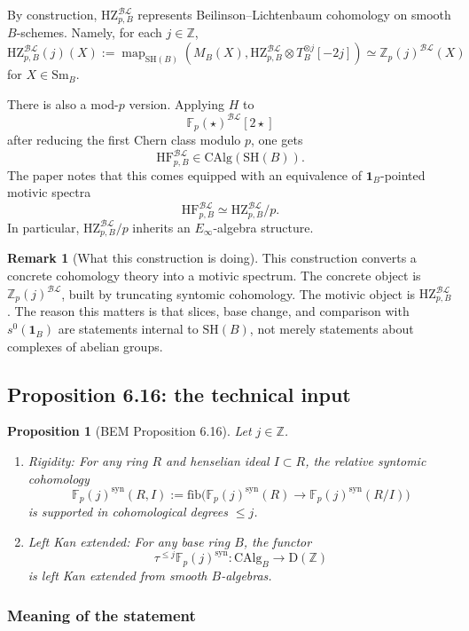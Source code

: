 \documentclass[11pt,a4paper]{article}
\newcommand{\Z}{\mathbb Z}
\newcommand{\F}{\mathbb F}
\newcommand{\SH}{\mathrm{SH}}
\newcommand{\Sm}{\mathrm{Sm}}
\newcommand{\CAlg}{\mathrm{CAlg}}
\newcommand{\D}{\mathrm{D}}
\newcommand{\BL}{\mathcal{BL}}
\newcommand{\syn}{\mathrm{syn}}
\newcommand{\HZ}{\mathrm{HZ}}
\newcommand{\HF}{\mathrm{HF}}
\newcommand{\fib}{\mathrm{fib}}
\newcommand{\1}{\mathbf 1}
\theoremstyle{bemstyle}
\newtheorem{proposition}[theorem]{Proposition}
\theoremstyle{definition}
\newtheorem{remark}[theorem]{Remark}
\begin{document}
By construction, \(\HZ^{\BL}_{p,B}\) represents Beilinson--Lichtenbaum cohomology on smooth \(B\)-schemes. Namely, for each \(j\in\Z\),
\[
  \HZ^{\BL}_{p,B}(j)(X)
  :=\operatorname{map}_{\SH(B)}(M_B(X),\HZ^{\BL}_{p,B}\otimes T_B^{\otimes j}[-2j])
  \simeq \Z_p(j)^{\BL}(X)
\]
for \(X\in\Sm_B\). 

There is also a mod-\(p\) version. Applying \(H\) to
\[
  \F_p(\star)^{\BL}[2\star]
\]
after reducing the first Chern class modulo \(p\), one gets
\[
  \HF^{\BL}_{p,B}\in\CAlg(\SH(B)).
\]
The paper notes that this comes equipped with an equivalence of \(\1_B\)-pointed motivic spectra
\[
  \HF^{\BL}_{p,B}\simeq \HZ^{\BL}_{p,B}/p.
\]
In particular, \(\HZ^{\BL}_{p,B}/p\) inherits an \(E_\infty\)-algebra structure.

\begin{remark}[What this construction is doing]
This construction converts a concrete cohomology theory into a motivic spectrum. The concrete object is \(\Z_p(j)^{\BL}\), built by truncating syntomic cohomology. The motivic object is \(\HZ^{\BL}_{p,B}\). The reason this matters is that slices, base change, and comparison with \(s^0(\1_B)\) are statements internal to \(\SH(B)\), not merely statements about complexes of abelian groups.
\end{remark}

\subsection{Proposition 6.16: the technical input}

\begin{proposition}[BEM Proposition 6.16]
Let \(j\in\Z\).
\begin{enumerate}
  \item Rigidity:  For any ring \(R\) and henselian ideal \(I\subset R\), the relative syntomic cohomology
  \[
    \F_p(j)^{\syn}(R,I):=\fib\bigl(\F_p(j)^{\syn}(R)\to \F_p(j)^{\syn}(R/I)\bigr)
  \]
  is supported in cohomological degrees \(\leq j\).
  \item Left Kan extended: For any base ring \(B\), the functor
  \[
    \tau^{\leq j}\F_p(j)^{\syn}:\CAlg_B\longrightarrow \D(\Z)
  \]
  is left Kan extended from smooth \(B\)-algebras.
\end{enumerate}
\end{proposition}

\subsubsection{Meaning of the statement}
\end{document}
